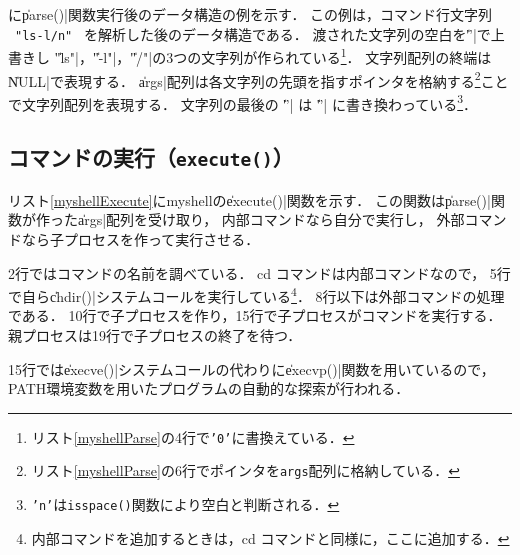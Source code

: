 に\|parse()|関数実行後のデータ構造の例を示す．
この例は，コマンド行文字列
~\texttt{"ls{\textvisiblespace}-l{\textvisiblespace}{\textvisiblespace}/{\bs}n"}~
を解析した後のデータ構造である．
渡された文字列の空白を\|'\0'|で上書きし
\|"ls"|，\|"-l"|，\|"/"|の3つの文字列が作られている\footnote{
  リスト\ref{myshellParse}の4行で\texttt{'{\bs}0'}に書換えている．}．
文字列配列の終端は\|NULL|で表現する．
\|args|配列は各文字列の先頭を指すポインタを格納する\footnote{
  リスト\ref{myshellParse}の6行でポインタを\texttt{args}配列に格納している．
}ことで文字列配列を表現する．
文字列の最後の \|'\n'| は \|'\0'| に書き換わっている\footnote{
  \texttt{'{\bs}n'}は\texttt{isspace()}関数により空白と判断される．
}．

\subsection{コマンドの実行（\texttt{execute()}）}
リスト\ref{myshellExecute}にmyshellの\|execute()|関数を示す．
この関数は\|parse()|関数が作った\|args|配列を受け取り，
内部コマンドなら自分で実行し，
外部コマンドなら子プロセスを作って実行させる．



2行ではコマンドの名前を調べている．
cd コマンドは内部コマンドなので，
5行で自ら\|chdir()|システムコールを実行している\footnote{
  内部コマンドを追加するときは，cd コマンドと同様に，ここに追加する．}．
8行以下は外部コマンドの処理である．
10行で子プロセスを作り，15行で子プロセスがコマンドを実行する．
親プロセスは19行で子プロセスの終了を待つ．

15行では\|execve()|システムコールの代わりに\|execvp()|関数を用いているので，
PATH環境変数を用いたプログラムの自動的な探索が行われる．

%
%
